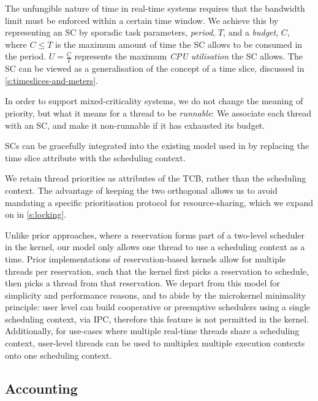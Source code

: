 The unfungible nature of time in real-time systems requires that the
bandwidth limit must be enforced within a certain time window. We
achieve this by representing an SC by sporadic task parameters, \emph{period}, \(T\), and a
\emph{budget}, \(C\), where \(C\leq T\) is the maximum amount of time
the SC allows to be consumed in the period. \(U=\frac{C}{T}\) represents the
maximum \emph{CPU utilisation} the SC allows. The SC can be viewed as
a generalisation of the concept of a time slice, discussed in \cref{s:timeslices-and-meters}.

In order to support mixed-criticality systems, we do not
change the meaning of priority, but what it means for a thread to be
\emph{runnable}: We associate each thread with an SC, and
make it non-runnable if it has exhausted its budget. 

\glspl{SC} can be gracefully integrated into the 
existing model used in \selfour by replacing the time slice attribute with the scheduling context.

We retain thread priorities as attributes of the \gls{TCB}, rather than the scheduling context. 
The advantage of keeping the two
orthogonal allows us to avoid mandating a specific prioritisation protocol for resource-sharing,
which we expand on in \cref{s:locking}.

Unlike prior approaches, where a reservation forms part of a two-level scheduler in the kernel, our
model only allows one thread to use a scheduling context as a time. 
Prior implementations of reservation-based kernels allow for multiple threads per reservation, 
such that the kernel first picks a reservation to schedule, then picks a thread from that reservation.
We depart from this model for simplicity and performance reasons, and to abide by the microkernel
minimality principle: user level can build cooperative or preemptive schedulers using a single
scheduling context, via \gls{IPC}, therefore this feature is not permitted in the kernel.
Additionally, for use-cases where multiple real-time threads share a scheduling context, user-level
threads can be used to multiplex multiple execution contexts onto one scheduling context.

\subsection{Accounting}
\label{sec:model-accounting}

